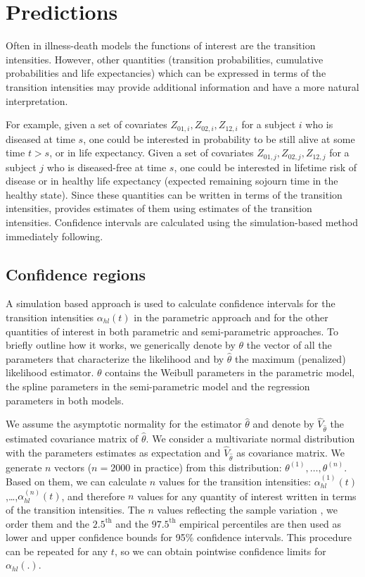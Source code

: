 \documentclass[article]{jss}
\begin{document}
\section{Predictions}
\label{sec-4}

Often in illness-death models the functions of interest are the
transition intensities.  However, other quantities (transition probabilities, cumulative probabilities and life
expectancies) which can be
expressed in terms of the transition intensities \citep{Touraine_2013}
may provide additional information and have a more natural
interpretation.

For example, given a set of covariates \(Z_{01,i},Z_{02,i},Z_{12,i}\)
for a subject \(i\) who is diseased at time \(s\), one could be interested
in probability to be still alive at some time \(t>s\), or in life
expectancy. Given a set of covariates \(Z_{01,j},Z_{02,j},Z_{12,j}\) for
a subject \(j\) who is diseased-free at time \(s\), one could be
interested in lifetime risk of disease or in healthy life expectancy
(expected remaining sojourn time in the healthy state). 
Since these quantities
can be written in terms of the transition intensities,
 provides estimates of them using estimates of the
transition intensities. Confidence intervals are
calculated using the simulation-based method immediately following.

\subsection{Confidence regions}
\label{sec-4-1}
\label{sec:CI}

A simulation based approach \citep{Mandel_2013} is used to calculate
confidence intervals for the transition intensities \(\alpha_{hl}(t)\)
in the parametric approach and for the other quantities of interest
in both parametric and semi-parametric approaches. 
To briefly outline how
it works, we generically denote by \(\theta\) the vector of all the
parameters that characterize the likelihood and by \(\hat\theta\) the
maximum (penalized) likelihood estimator.
\(\theta\) contains the Weibull parameters in the parametric model,
the spline parameters in the semi-parametric model
and the regression parameters in both models. 

We assume the asymptotic normality for the estimator \(\hat{\theta}\)
and denote by \(\hat{V}_{\hat{\theta}}\) the estimated covariance matrix
of \(\hat{\theta}\). We consider a multivariate normal distribution with
the parameters estimates as expectation and \(\hat{V}_{\hat{\theta}}\)
as covariance matrix. We generate \(n\) vectors (\(n=2000\) in practice)
from this distribution: \(\theta^{(1)},\ldots,\theta^{(n)}\).  Based on
them, we can calculate \(n\) values for the transition intensities:
\(\alpha_{hl}^{(1)}(t)\),\ldots,\(\alpha_{hl}^{(n)}(t)\), and therefore
\(n\) values for any quantity of interest written in terms of the
transition intensities.  The \(n\) values reflecting the sample
variation \citep{Aalen_Farewell_De_Angelis_Day_Gill_1997}, we order
them and the \(2.5^{\text{th}}\) and the \(97.5^{\text{th}}\) empirical
percentiles are then used as lower and upper confidence bounds for
95\% confidence intervals.  This procedure can be repeated for any
\(t\), so we can obtain pointwise confidence limits for
\({\alpha}_{hl}(.)\).
\end{document}
